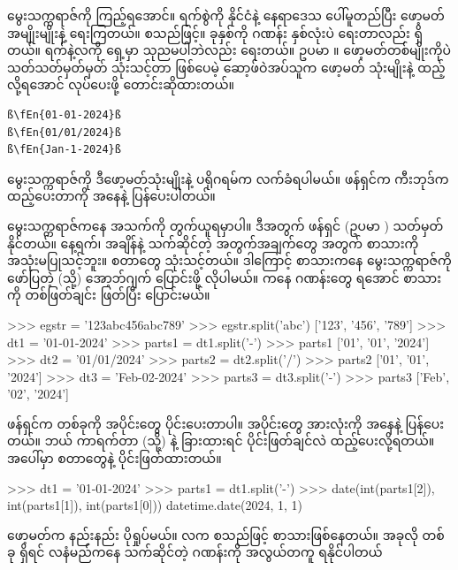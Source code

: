 မွေးသက္ကရာဇ်ကို ကြည့်ရအောင်။ ရက်စွဲကို နိုင်ငံနဲ့ နေရာဒေသ ပေါ်မူတည်ပြီး ဖော့မတ်အမျိုးမျိုးနဲ့ ရေးကြတယ်။ \fEn{,} \fEn{,}  စသည်ဖြင့်။ ခုနှစ်ကို ဂဏန်း နှစ်လုံးပဲ ရေးတာလည်း ရှိတယ်။ ရက်နဲ့လကို ရှေ့မှာ သုညမပါဘဲလည်း ရေးတယ်။ ဥပမာ \fEn{,} \fEn{,}  ။ ဖော့မတ်တစ်မျိုးကိုပဲ သတ်သတ်မှတ်မှတ် သုံးသင့်တာ ဖြစ်ပေမဲ့ ဆော့ဖ်ဝဲအပ်သူက ဖော့မတ် သုံးမျိုးနဲ့ ထည့်လို့ရအောင် လုပ်ပေးဖို့ တောင်းဆိုထားတယ်။
\begin{verbatim}
ß\fEn{01-01-2024}ß
ß\fEn{01/01/2024}ß
ß\fEn{Jan-1-2024}ß
\end{verbatim}
မွေးသက္ကရာဇ်ကို ဒီဖော့မတ်သုံးမျိုးနဲ့  ပရိုဂရမ်က လက်ခံရပါမယ်။  ဖန်ရှင်က ကီးဘုဒ်ကထည့်ပေးတာကို  အနေနဲ့ ပြန်ပေးပါတယ်။

မွေးသက္ကရာဇ်ကနေ အသက်ကို တွက်ယူရမှာပါ။ ဒီအတွက် ဖန်ရှင် (ဥပမာ ) သတ်မှတ်နိုင်တယ်။ နေ့ရက်၊ အချိန်နဲ့ သက်ဆိုင်တဲ့ အတွက်\allowbreak အချက်တွေ အတွက် စာသားကို အသုံးမပြုသင့်ဘူး။ \fEn{,}  စတာတွေ သုံးသင့်တယ်။ ဒါကြောင့် စာသားကနေ မွေးသက္ကရာဇ်ကို ဖော်ပြတဲ့  (သို့)  အော့ဘ်ဂျက် ပြောင်းဖို့ လိုပါမယ်။  ကနေ \fEn{,} \fEn{,}  ဂဏန်းတွေ ရအောင် စာသားကို တစ်ဖြတ်ချင်း ဖြတ်ပြီး ပြောင်းမယ်။ 

\begin{codetxt}
>>> egstr = '123abc456abc789'
>>> egstr.split('abc')
['123', '456', '789']
>>> dt1 = '01-01-2024'
>>> parts1 = dt1.split('-')
>>> parts1
['01', '01', '2024']
>>> dt2 = '01/01/2024'
>>> parts2 = dt2.split('/')
>>> parts2
['01', '01', '2024']
>>> dt3 = 'Feb-02-2024'
>>> parts3 = dt3.split('-')
>>> parts3
['Feb', '02', '2024']
\end{codetxt}
 ဖန်ရှင်က  တစ်ခုကို အပိုင်းတွေ ပိုင်းပေးတာပါ။ အပိုင်းတွေ အားလုံးကို  အနေနဲ့ ပြန်ပေးတယ်။ ဘယ် ကာရက်တာ (သို့)  နဲ့ ခြားထားရင် ပိုင်းဖြတ်ချင်လဲ ထည့်ပေးလို့ရတယ်။ အပေါ်မှာ \fEn{,} \fEn{,}  စတာတွေနဲ့ ပိုင်းဖြတ်ထားတယ်။

\begin{codetxt}
>>> dt1 = '01-01-2024'
>>> parts1 = dt1.split('-')
>>> date(int(parts1[2]), int(parts1[1]), int(parts1[0]))
datetime.date(2024, 1, 1)
\end{codetxt}

 ဖော့မတ်က နည်းနည်း ပိုရှုပ်မယ်။ လက \fEn{,}  စသည်ဖြင့်  စာသားဖြစ်နေတယ်။ အခုလို  တစ်ခု ရှိရင် လနံမည်ကနေ သက်ဆိုင်တဲ့ ဂဏန်းကို အလွယ်တကူ ရနိုင်ပါတယ်

